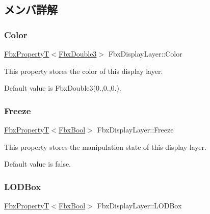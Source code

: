 \subsection{メンバ詳解}
\mbox{\label{class_fbx_display_layer_ab43c4c4514ffc390a0ae1d7997a2bf06}} 
\subsubsection{\texorpdfstring{Color}{Color}}
{\footnotesize\ttfamily \hyperlink{class_fbx_property_t}{Fbx\+PropertyT}$<$\hyperlink{fbxtypes_8h_ae0a96f14cde566774c7553aa7523b7a7}{Fbx\+Double3}$>$ Fbx\+Display\+Layer\+::\+Color}

This property stores the color of this display layer.

Default value is Fbx\+Double3(0.,0.,0.). \mbox{\label{class_fbx_display_layer_abbda272dffabbf9c54947efefcce141a}} 
\subsubsection{\texorpdfstring{Freeze}{Freeze}}
{\footnotesize\ttfamily \hyperlink{class_fbx_property_t}{Fbx\+PropertyT}$<$\hyperlink{fbxtypes_8h_a92e0562b2fe33e76a242f498b362262e}{Fbx\+Bool}$>$ Fbx\+Display\+Layer\+::\+Freeze}

This property stores the manipulation state of this display layer.

Default value is false. \mbox{\label{class_fbx_display_layer_ae1e076e8613ebc76150369577dbba985}} 
\subsubsection{\texorpdfstring{L\+O\+D\+Box}{LODBox}}
{\footnotesize\ttfamily \hyperlink{class_fbx_property_t}{Fbx\+PropertyT}$<$\hyperlink{fbxtypes_8h_a92e0562b2fe33e76a242f498b362262e}{Fbx\+Bool}$>$ Fbx\+Display\+Layer\+::\+L\+O\+D\+Box}

